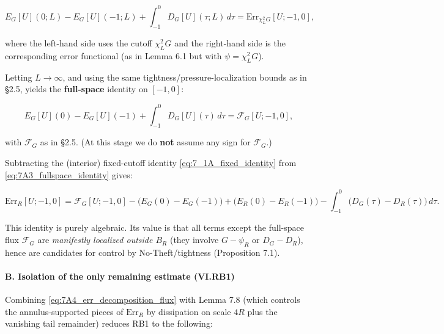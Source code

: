 \documentclass[
  11pt,
]{article}
\begin{document}
\begin{equation}
E_G[U](0;L)-E_G[U](-1;L)
+\int_{-1}^{0}D_G[U](\tau;L)\,d\tau
=
\mathrm{Err}_{\chi_L^2G}[U;-1,0],
\tag{7.A2}\label{eq:7A2_L_recombined}
\end{equation}

where the left-hand side uses the cutoff \(\chi_L^2G\) and the right-hand side is the corresponding error functional (as in Lemma 6.1 but with \(\psi=\chi_L^2G\)).

Letting \(L\to\infty\), and using the same tightness/pressure-localization bounds as in §2.5, yields the \textbf{full-space} identity on \([-1,0]\):

\begin{equation}
E_G[U](0)-E_G[U](-1)
+\int_{-1}^{0}D_G[U](\tau)\,d\tau
=
\mathcal F_G[U;-1,0],
\tag{7.A3}\label{eq:7A3_fullspace_identity}
\end{equation}

with \(\mathcal F_G\) as in §2.5. (At this stage we do \textbf{not} assume any sign for \(\mathcal F_G\).)

Subtracting the (interior) fixed-cutoff identity \eqref{eq:7_1A_fixed_identity} from \eqref{eq:7A3_fullspace_identity} gives:

\begin{equation}
\mathrm{Err}_R[U;-1,0]
=
\mathcal F_G[U;-1,0]
-\Big(E_G(0)-E_G(-1)\Big)
+\Big(E_R(0)-E_R(-1)\Big)
-\int_{-1}^{0}\Big(D_G(\tau)-D_R(\tau)\Big)\,d\tau.
\tag{7.A4}\label{eq:7A4_err_decomposition_flux}
\end{equation}

This identity is purely algebraic. Its value is that all terms except the full-space flux \(\mathcal F_G\) are \emph{manifestly localized outside \(B_{R}\)} (they involve \(G-\psi_R\) or \(D_G-D_R\)), hence are candidates for control by No-Theft/tightness (Proposition 7.1).

\hypertarget{b.-isolation-of-the-only-remaining-estimate-vi.rb1}{%
\paragraph{B. Isolation of the only remaining estimate (VI.RB1)}\label{b.-isolation-of-the-only-remaining-estimate-vi.rb1}}

Combining \eqref{eq:7A4_err_decomposition_flux} with Lemma 7.8 (which controls the annulus-supported pieces of \(\mathrm{Err}_R\) by dissipation on scale \(4R\) plus the vanishing tail remainder) reduces RB1 to the following:
\end{document}

